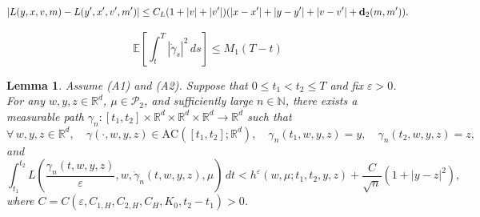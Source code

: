 \documentclass[10pt,a4paper]{amsart}
\newtheorem{lemma}{Lemma}
\newcommand{\R}{\mathbb{R}} %
\newcommand{\e}{\varepsilon}
\newcommand{\ep}{\varepsilon}
\begin{document}
    \begin{equation}\label{eqn:LmLip}
    |L(y,x,v,m)-L(y',x',v',m')|\le C_L(1+|v|+|v'|)(|x-x'|+|y-y'|+|v-v'|+{\bf d}_2(m,m')).
    \end{equation}

\begin{equation}\label{eqn:gamdelvelbd}
\mathbb{E}\left[\int_{t}^T|\dot{\gamma}_s|^2 \,ds\right] \leq M_1(T-t)
\end{equation}

\begin{lemma}\label{lem:measapp}
Assume (A1) and (A2). Suppose that \(0\leq t_1<t_2\leq T\) and fix \(\varepsilon>0\). For any $w,y,z \in \R^d$, $\mu \in \mathcal{P}_2$, and sufficiently large $n\in \mathbb{N}$, there exists a measurable path $\gamma_n:[t_1,t_2]\times\mathbb{R}^d \times\mathbb{R}^d \times\mathbb{R}^d\to\mathbb{R}^d$ such that
\[
\forall \, w,y,z \in \R^d,\quad \gamma(\cdot, w,y,z) \in \mathrm{AC}([t_1,t_2];\R^d),\quad \gamma_n(t_1,w,y,z)=y, \quad \gamma_n(t_2,w,y,z)=z,
\]
and
\[
\int_{t_1}^{t_2}
L \left(\frac{\gamma_n(t,w,y,z)}{\varepsilon}, w, \dot{\gamma}_n(t,w,y,z),\mu\right)\,dt
<
h^\e\left(w,\mu;t_1, t_2, y, z\right)+\frac{C}{\sqrt{n}}\left(1+|y-z|^2\right),
\]
where $C=C(\ep,C_{1,H}, C_{2, H}, C_H, K_0, t_2-t_1)>0$.
\end{lemma}
\end{document}

